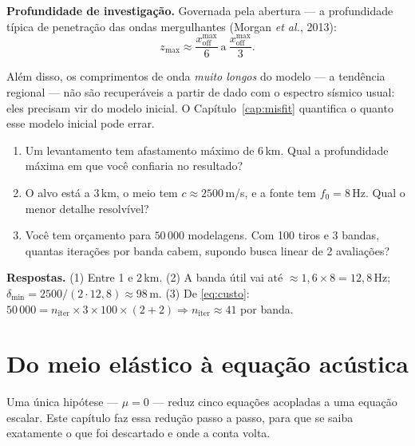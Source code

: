 \documentclass[11pt,a4paper,oneside]{report}
\begin{document}
\textbf{Profundidade de investiga\c{c}\~ao.} Governada pela abertura --- a
profundidade t\'ipica de penetra\c{c}\~ao das ondas mergulhantes (Morgan
\emph{et al.}, 2013):
\begin{equation}
z_{\max} \approx \frac{x_{\text{off}}^{\max}}{6}\ \text{a}\
\frac{x_{\text{off}}^{\max}}{3}.
\end{equation}

Al\'em disso, os comprimentos de onda \emph{muito longos} do modelo --- a
tend\^encia regional --- n\~ao s\~ao recuper\'aveis a partir de dado com o
espectro s\'ismico usual: eles precisam vir do modelo inicial. O
Cap\'itulo~\ref{cap:misfit} quantifica o quanto esse modelo inicial pode
errar.

\begin{exercicio}
\begin{enumerate}[leftmargin=*, itemsep=2pt]
\item Um levantamento tem afastamento m\'aximo de 6\,km. Qual a profundidade
m\'axima em que voc\^e confiaria no resultado?
\item O alvo est\'a a 3\,km, o meio tem $c \approx 2500$\,m/s, e a fonte tem
$f_0 = 8$\,Hz. Qual o menor detalhe resolv\'ivel?
\item Voc\^e tem or\c{c}amento para $50\,000$ modelagens. Com 100 tiros e 3
bandas, quantas itera\c{c}\~oes por banda cabem, supondo busca linear de 2
avalia\c{c}\~oes?
\end{enumerate}
\textbf{Respostas.} (1) Entre 1 e 2\,km. (2) A banda \'util vai at\'e
$\approx 1{,}6 \times 8 = 12{,}8$\,Hz; $\delta_{\min} = 2500/(2\cdot 12{,}8)
\approx 98$\,m. (3) De \eqref{eq:custo}: $50\,000 = n_{\text{iter}} \times 3
\times 100 \times (2 + 2) \Rightarrow n_{\text{iter}} \approx 41$ por
banda.
\end{exercicio}

\chapter{Do meio el\'astico \`a equa\c{c}\~ao ac\'ustica}
\label{cap:fisica}

\begin{ideia}
Uma \'unica hip\'otese --- $\mu = 0$ --- reduz cinco equa\c{c}\~oes acopladas
a uma equa\c{c}\~ao escalar. Este cap\'itulo faz essa redu\c{c}\~ao passo a
passo, para que se saiba exatamente o que foi descartado e onde a conta volta.
\end{ideia}
\end{document}
